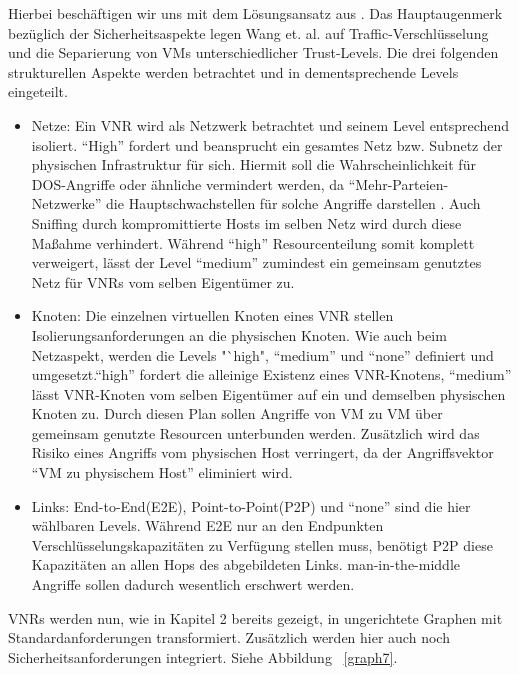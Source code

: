 \documentclass{lni}
\begin{document}
Hierbei beschäftigen wir uns mit dem Lösungsansatz aus \cite{wang2016towards}. 
Das Hauptaugenmerk bezüglich der Sicherheitsaspekte legen Wang et. al. auf Traffic-Verschlüsselung und die Separierung von VMs unterschiedlicher Trust-Levels. Die drei folgenden strukturellen Aspekte werden betrachtet und in dementsprechende Levels eingeteilt.
\begin{itemize}
\item Netze:\newline
Ein VNR wird als Netzwerk betrachtet und seinem Level entsprechend isoliert. "`High"' fordert und beansprucht ein gesamtes Netz bzw. Subnetz der physischen Infrastruktur für sich. Hiermit soll die Wahrscheinlichkeit für DOS-Angriffe oder ähnliche vermindert werden, da "`Mehr-Parteien-Netzwerke"' die Hauptschwachstellen für solche Angriffe darstellen \cite{DOS}. Auch Sniffing durch kompromittierte Hosts im selben Netz wird durch diese Maßahme verhindert. Während "`high"' Resourcenteilung somit komplett verweigert, lässt der Level "`medium"' zumindest ein gemeinsam genutztes Netz für VNRs vom selben Eigentümer zu.

\item Knoten:\newline
Die einzelnen virtuellen Knoten eines VNR stellen Isolierungsanforderungen an die physischen Knoten. Wie auch beim Netzaspekt, werden die Levels "`high", "`medium"' und "`none"' definiert und umgesetzt."`high"' fordert die alleinige Existenz eines VNR-Knotens, "`medium"' lässt VNR-Knoten vom selben Eigentümer auf ein und demselben physischen Knoten zu. Durch diesen Plan sollen Angriffe von VM zu VM über gemeinsam genutzte Resourcen unterbunden werden. Zusätzlich wird das Risiko eines Angriffs vom physischen Host verringert, da der Angriffsvektor "`VM zu physischem Host"' eliminiert wird.

\item Links:\newline
End-to-End(E2E), Point-to-Point(P2P) und "`none"' sind die hier wählbaren Levels. Während E2E nur an den Endpunkten Verschlüsselungskapazitäten zu Verfügung stellen muss, benötigt P2P diese Kapazitäten an allen Hops des abgebildeten Links. man-in-the-middle Angriffe sollen dadurch wesentlich erschwert werden. 
\end{itemize}
VNRs werden nun, wie in Kapitel 2 bereits gezeigt, in ungerichtete Graphen mit Standardanforderungen transformiert. Zusätzlich werden hier auch noch Sicherheitsanforderungen integriert. Siehe Abbildung ~\ref{graph7}.\newline
\end{document}
